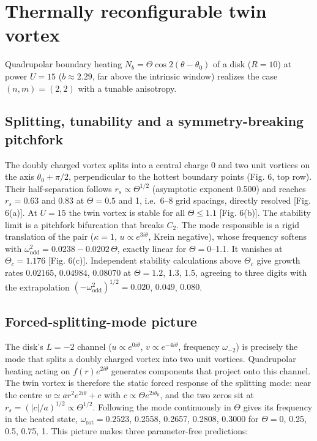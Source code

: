 \hypertarget{thermally-reconfigurable-twin-vortex}{%
\section{Thermally reconfigurable twin vortex}\label{thermally-reconfigurable-twin-vortex}}

Quadrupolar boundary heating \(N_b = \Theta \cos 2(\theta - \theta_0)\) of a disk (\(R = 10\)) at power \(U = 15\) (\(b \approx 2.29\), far above the intrinsic window) realizes the case \((n, m) = (2, 2)\) with a tunable anisotropy.

\hypertarget{splitting-tunability-and-a-symmetry-breaking-pitchfork}{%
\subsection{Splitting, tunability and a symmetry-breaking pitchfork}\label{splitting-tunability-and-a-symmetry-breaking-pitchfork}}

The doubly charged vortex splits into a central charge 0 and two unit vortices on the axis \(\theta_0 + \pi/2\), perpendicular to the hottest boundary points (Fig. 6, top row). Their half-separation follows \(r_s \propto \Theta^{1/2}\) (asymptotic exponent 0.500) and reaches \(r_s = 0.63\) and 0.83 at \(\Theta = 0.5\) and 1, i.e.~6--8 grid spacings, directly resolved {[}Fig. 6(a){]}. At \(U = 15\) the twin vortex is stable for all \(\Theta \le 1.1\) {[}Fig. 6(b){]}. The stability limit is a pitchfork bifurcation that breaks \(C_2\). The mode responsible is a rigid translation of the pair (\(\kappa = 1\), \(u \propto e^{3 i \theta}\), Krein negative), whose frequency softens with \(\omega_\mathrm{odd}^2 = 0.0238 - 0.0202\,\Theta\), exactly linear for \(\Theta = 0\)--1.1. It vanishes at \(\Theta_c = 1.176\) {[}Fig. 6(c){]}. Independent stability calculations above \(\Theta_c\) give growth rates \(0.02165\), \(0.04984\), \(0.08070\) at \(\Theta = 1.2\), 1.3, 1.5, agreeing to three digits with the extrapolation \((-\omega_\mathrm{odd}^2)^{1/2} = 0.020\), \(0.049\), \(0.080\).

\hypertarget{forced-splitting-mode-picture}{%
\subsection{Forced-splitting-mode picture}\label{forced-splitting-mode-picture}}

The disk's \(L = -2\) channel (\(u \propto e^{0 i\theta}\), \(v \propto e^{-4 i\theta}\), frequency \(\omega_{-2}\)) is precisely the mode that splits a doubly charged vortex into two unit vortices. Quadrupolar heating acting on \(f(r) e^{2 i \theta}\) generates components that project onto this channel. The twin vortex is therefore the static forced response of the splitting mode: near the centre \(w \simeq a r^2 e^{2 i \theta} + c\) with \(c \propto \Theta e^{2 i \theta_0}\), and the two zeros sit at \(r_s = (|c|/a)^{1/2} \propto \Theta^{1/2}\). Following the mode continuously in \(\Theta\) gives its frequency in the heated state, \(\omega_\mathrm{rot} = 0.2523\), 0.2558, 0.2657, 0.2808, 0.3000 for \(\Theta = 0\), 0.25, 0.5, 0.75, 1. This picture makes three parameter-free predictions:

